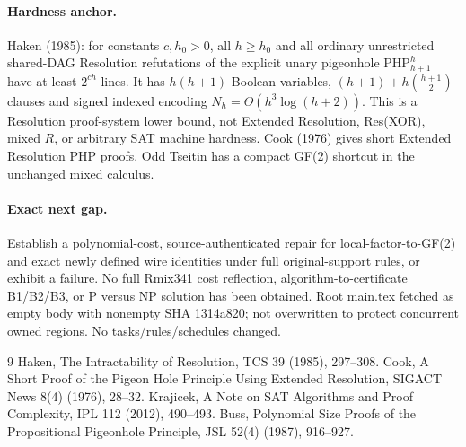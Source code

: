 \documentclass[11pt]{article}
\begin{document}
\paragraph{Hardness anchor.} Haken (1985): for constants \(c,h_0>0\), all \(h\ge h_0\) and all ordinary unrestricted shared-DAG Resolution refutations of the explicit unary pigeonhole \(\mathrm{PHP}_{h+1}^{h}\) have at least \(2^{ch}\) lines. It has \(h(h+1)\) Boolean variables, \((h+1)+h\binom{h+1}{2}\) clauses and signed indexed encoding \(N_h=\Theta(h^3\log(h+2))\). This is a Resolution proof-system lower bound, not Extended Resolution, Res(XOR), mixed \(R\), or arbitrary SAT machine hardness. Cook (1976) gives short Extended Resolution PHP proofs. Odd Tseitin has a compact GF(2) shortcut in the unchanged mixed calculus.

\paragraph{Exact next gap.} Establish a polynomial-cost, source-authenticated repair for local-factor-to-GF(2) and exact newly defined wire identities under full original-support rules, or exhibit a failure. No full Rmix341 cost reflection, algorithm-to-certificate B1/B2/B3, or P versus NP solution has been obtained. Root main.tex fetched as empty body with nonempty SHA 1314a820; not overwritten to protect concurrent owned regions. No tasks/rules/schedules changed.
\begin{thebibliography}{9}
 Haken, The Intractability of Resolution, TCS 39 (1985), 297--308.
 Cook, A Short Proof of the Pigeon Hole Principle Using Extended Resolution, SIGACT News 8(4) (1976), 28--32.
 Krajicek, A Note on SAT Algorithms and Proof Complexity, IPL 112 (2012), 490--493.
 Buss, Polynomial Size Proofs of the Propositional Pigeonhole Principle, JSL 52(4) (1987), 916--927.
\end{thebibliography}
\end{document}
